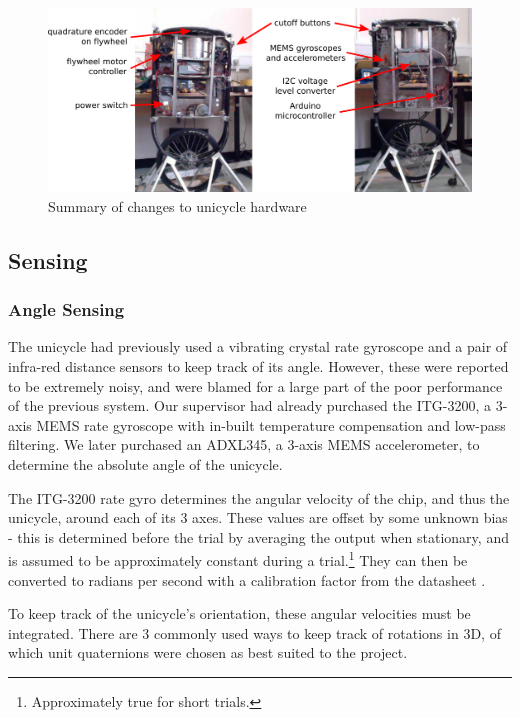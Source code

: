 \documentclass{IIBproject}
\begin{document}
\begin{figure}[htpb]
  \begin{center}
    \includegraphics[width=15cm]{figures/hardware.pdf}
    \end{center}
    \caption{Summary of changes to unicycle hardware}
    \label{fig:hardware}
    \end{figure}

\subsection{Sensing}

\subsubsection{Angle Sensing}

The unicycle had previously used a vibrating crystal rate gyroscope and a pair
of infra-red distance sensors to keep track of its angle. However, these were
reported to be extremely noisy, and were blamed for a large part of the poor
performance of the previous system. Our supervisor had already purchased the
ITG-3200, a 3-axis MEMS rate gyroscope with in-built temperature compensation
and low-pass filtering. We later purchased an ADXL345, a 3-axis MEMS
accelerometer, to determine the absolute angle of the unicycle.

The ITG-3200 rate gyro determines the angular velocity of the chip, and thus
the unicycle, around each of its 3 axes. These values are offset by some
unknown bias - this is determined before the trial by averaging the output
when stationary, and is assumed to be approximately constant during a
trial.\footnote{Approximately true for short trials.} They can then be
converted to radians per second with a calibration factor from the datasheet
\cite{ref:itg3200}.

To keep track of the unicycle's orientation, these angular velocities must be
integrated. There are 3 commonly used ways to keep track of rotations in 3D,
of which unit quaternions were chosen as best suited to the project.
\end{document}
